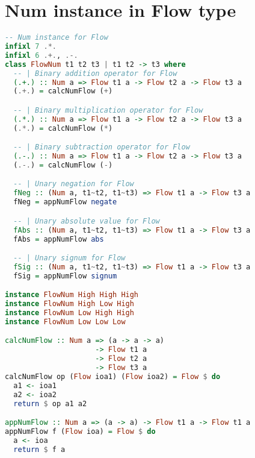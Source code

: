 \section{Num instance in Flow type}
\label{app:num_type}
\begin{lstlisting}[language=Haskell]
-- Num instance for Flow
infixl 7 .*.
infixl 6 .+., .-.
class FlowNum t1 t2 t3 | t1 t2 -> t3 where
  -- | Binary addition operator for Flow
  (.+.) :: Num a => Flow t1 a -> Flow t2 a -> Flow t3 a
  (.+.) = calcNumFlow (+)

  -- | Binary multiplication operator for Flow
  (.*.) :: Num a => Flow t1 a -> Flow t2 a -> Flow t3 a
  (.*.) = calcNumFlow (*)

  -- | Binary subtraction operator for Flow
  (.-.) :: Num a => Flow t1 a -> Flow t2 a -> Flow t3 a
  (.-.) = calcNumFlow (-)

  -- | Unary negation for Flow
  fNeg :: (Num a, t1~t2, t1~t3) => Flow t1 a -> Flow t3 a
  fNeg = appNumFlow negate

  -- | Unary absolute value for Flow
  fAbs :: (Num a, t1~t2, t1~t3) => Flow t1 a -> Flow t3 a
  fAbs = appNumFlow abs

  -- | Unary signum for Flow
  fSig :: (Num a, t1~t2, t1~t3) => Flow t1 a -> Flow t3 a
  fSig = appNumFlow signum

instance FlowNum High High High
instance FlowNum High Low High
instance FlowNum Low High High
instance FlowNum Low Low Low

calcNumFlow :: Num a => (a -> a -> a)
                     -> Flow t1 a
                     -> Flow t2 a
                     -> Flow t3 a
calcNumFlow op (Flow ioa1) (Flow ioa2) = Flow $ do
  a1 <- ioa1
  a2 <- ioa2
  return $ op a1 a2

appNumFlow :: Num a => (a -> a) -> Flow t1 a -> Flow t1 a
appNumFlow f (Flow ioa) = Flow $ do
  a <- ioa
  return $ f a
\end{lstlisting}
